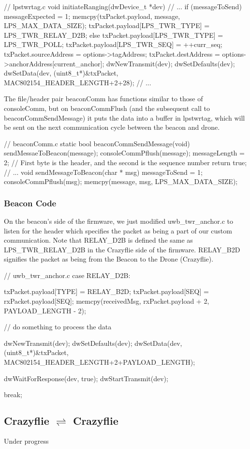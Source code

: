 \documentclass[]{article}
\begin{document}
\begin{C}
// lpstwrtag.c
void initiateRanging(dwDevice_t *dev) {
//	...
	if (messageToSend) {
		messageExpected = 1;
		memcpy(txPacket.payload, message, LPS_MAX_DATA_SIZE);
		txPacket.payload[LPS_TWR_TYPE] = LPS_TWR_RELAY_D2B;
	}
	else {
		txPacket.payload[LPS_TWR_TYPE] = LPS_TWR_POLL;
	}
	txPacket.payload[LPS_TWR_SEQ] = ++curr_seq;
	txPacket.sourceAddress = options->tagAddress;
	txPacket.destAddress = options->anchorAddress[current_anchor];
	dwNewTransmit(dev);
	dwSetDefaults(dev);
	dwSetData(dev, (uint8_t*)&txPacket, MAC802154_HEADER_LENGTH+2+28);
//	...
}
\end{C}

The file/header pair beaconComm has functions similar to those of consoleComm, but on beaconCommFlush (and the subsequent call to  beaconCommSendMessage) it puts the data into a buffer in lpstwrtag, which will be sent on the next communication cycle between the beacon and drone.

\begin{C}
// beaconComm.c
static bool beaconCommSendMessage(void) {
	sendMessaeToBeacon(message);
	consoleCommPflush(message);
	messageLength = 2;
	// First byte is the header, and the second is the sequence number
	return true;
}
//	...
void sendMessageToBeacon(char * msg) {
	messageToSend = 1;
	consoleCommPflush(msg);
	memcpy(message, msg, LPS_MAX_DATA_SIZE);
}
\end{C}

\subsubsection{Beacon Code}

On the beacon's side of the firmware, we just modified uwb\_twr\_anchor.c to listen for the header which specifies the packet as being a part of our custom communication. Note that RELAY\_D2B is defined the same as LPS\_TWR\_RELAY\_D2B in the Crazyflie side of the firmware. RELAY\_B2D signifies the packet as being from the Beacon to the Drone (Crazyflie).

\begin{C}
// uwb_twr_anchor.c
case RELAY_D2B:
{      
	txPacket.payload[TYPE] = RELAY_B2D;
	txPacket.payload[SEQ] = rxPacket.payload[SEQ];
	memcpy(receivedMsg, rxPacket.payload + 2, PAYLOAD_LENGTH - 2);
	
	// do something to process the data
	
	dwNewTransmit(dev);
	dwSetDefaults(dev);
	dwSetData(dev, (uint8_t*)&txPacket, MAC802154_HEADER_LENGTH+2+PAYLOAD_LENGTH);
	
	dwWaitForResponse(dev, true);
	dwStartTransmit(dev);
	
	break;
}
\end{C}

\subsection{\texorpdfstring{Crazyflie $\rightleftharpoons$ Crazyflie}%
	{Between Crazyflie and Crazyflie}}

\noindent Under progress
\end{document}
